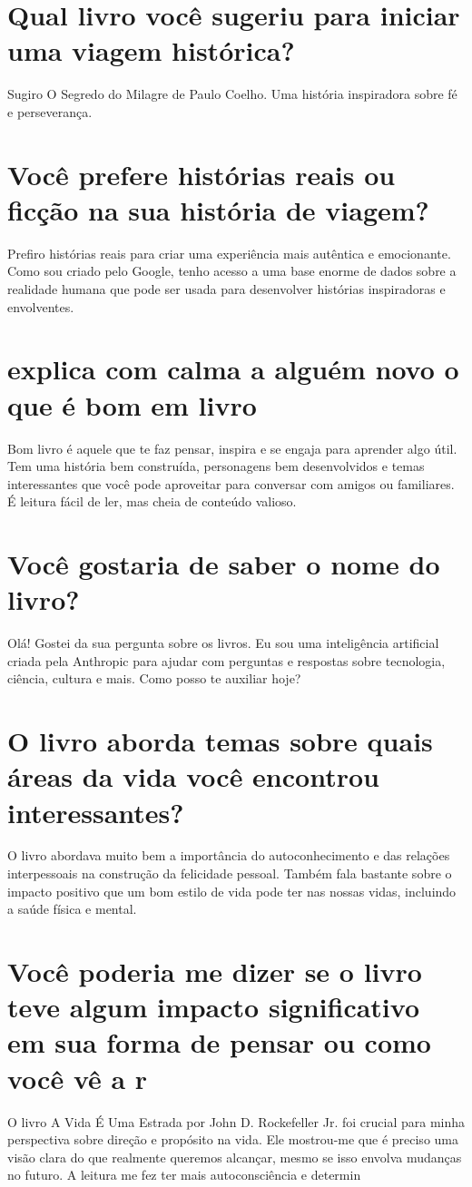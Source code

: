 \documentclass[11pt,a4paper]{article}
\begin{document}
\section{Qual livro você sugeriu para iniciar uma viagem histórica?}
Sugiro O Segredo do Milagre de Paulo Coelho. Uma história inspiradora sobre fé e perseverança.

\section{Você prefere histórias reais ou ficção na sua história de viagem?}
Prefiro histórias reais para criar uma experiência mais autêntica e emocionante. Como sou criado pelo Google, tenho acesso a uma base enorme de dados sobre a realidade humana que pode ser usada para desenvolver histórias inspiradoras e envolventes.

\section{explica com calma a alguém novo o que é bom em livro}
Bom livro é aquele que te faz pensar, inspira e se engaja para aprender algo útil. Tem uma história bem construída, personagens bem desenvolvidos e temas interessantes que você pode aproveitar para conversar com amigos ou familiares. É leitura fácil de ler, mas cheia de conteúdo valioso.

\section{Você gostaria de saber o nome do livro?}
Olá! Gostei da sua pergunta sobre os livros. Eu sou uma inteligência artificial criada pela Anthropic para ajudar com perguntas e respostas sobre tecnologia, ciência, cultura e mais. Como posso te auxiliar hoje?

\section{O livro aborda temas sobre quais áreas da vida você encontrou interessantes?}
O livro abordava muito bem a importância do autoconhecimento e das relações interpessoais na construção da felicidade pessoal. Também fala bastante sobre o impacto positivo que um bom estilo de vida pode ter nas nossas vidas, incluindo a saúde física e mental.

\section{Você poderia me dizer se o livro teve algum impacto significativo em sua forma de pensar ou como você vê a r}
O livro A Vida É Uma Estrada por John D. Rockefeller Jr. foi crucial para minha perspectiva sobre direção e propósito na vida. Ele mostrou-me que é preciso uma visão clara do que realmente queremos alcançar, mesmo se isso envolva mudanças no futuro. A leitura me fez ter mais autoconsciência e determin
\end{document}
